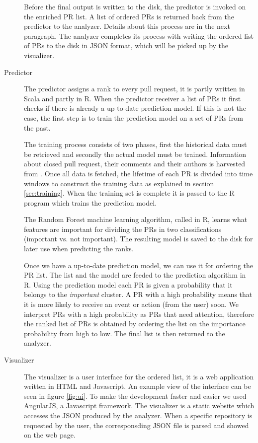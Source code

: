 \begin{description}
Before the final output is written to the disk, the predictor is invoked on the enriched PR list.
A list of ordered PRs is returned back from the predictor to the analyzer.
Details about this process are in the next paragraph.
The analyzer completes its process with writing the ordered list of PRs to the disk in JSON format, which will be picked up by the visualizer.

\item[Predictor]
The predictor assigns a rank to every pull request, it is partly written in Scala and partly in R.
When the predictor receiver a list of PRs it first checks if there is already a up-to-date prediction model.
If this is not the case, the first step is to train the prediction model on a set of PRs from the past.

The training process consists of two phases, first the historical data must be retrieved and secondly the actual model must be trained.
Information about closed pull request, their comments and their authors is harvested from \ghtorrent.
Once all data is fetched, the lifetime of each PR is divided into time windows to construct the training data as explained in section \ref{sec:training}.
When the training set is complete it is passed to the R program which trains the prediction model.

The Random Forest machine learning algorithm, called in R, learns what features are important for dividing the PRs in two classifications (important vs. not important).
The resulting model is saved to the disk for later use when predicting the ranks.

Once we have a up-to-date prediction model, we can use it for ordering the PR list.
The list and the model are feeded to the prediction algorithm in R.
Using the prediction model each PR is given a probability that it belongs to the \emph{important} cluster.
A PR with a high probability means that it is more likely to receive an event or action (from the user) soon.
We interpret PRs with a high probability as PRs that need attention, therefore the ranked list of PRs is obtained by ordering the list on the importance probability from high to low.
The final list is then returned to the analyzer.

\item[Visualizer]
The visualizer is a user interface for the ordered list, it is a web application written in HTML and Javascript.
An example view of the interface can be seen in figure \ref{fig:ui}.
To make the development faster and easier we used AngularJS, a Javascript framework.
The visualizer is a static website which accesses the JSON produced by the analyzer.
When a specific repository is requested by the user, the corresponsding JSON file is parsed and showed on the web page.


\end{description}
